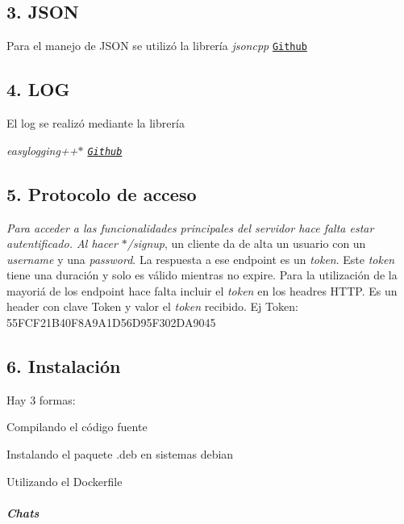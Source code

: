  \subsection*{3. J\+S\+ON}

Para el manejo de J\+S\+ON se utilizó la librería {\itshape jsoncpp} \href{https://github.com/open-source-parsers/jsoncpp}{\tt Github}



 \subsection*{4. L\+OG}

El log se realizó mediante la librería {\itshape easylogging++$\ast$ \href{https://github.com/easylogging/easyloggingpp}{\tt Github} 

 \subsection*{5. Protocolo de acceso}}

{\itshape  Para acceder a las funcionalidades principales del servidor hace falta estar autentificado. Al hacer $\ast$/signup}, un cliente da de alta un usuario con un {\itshape username} y una {\itshape password}. La respuesta a ese endpoint es un {\itshape token}. Este {\itshape token} tiene una duración y solo es válido mientras no expire. Para la utilización de la mayoriá de los endpoint hace falta incluir el {\itshape token} en los headres H\+T\+TP. Es un header con clave {\ttfamily Token} y valor el {\itshape token} recibido. Ej {\ttfamily Token\+: 55\+F\+C\+F21\+B40\+F8\+A9\+A1\+D56\+D95\+F302\+D\+A9045}

\subsection*{6. Instalación}

Hay 3 formas\+:
\begin{DoxyItemize}
\item Compilando el código fuente
\item Instalando el paquete {\ttfamily .deb} en sistemas debian
\item Utilizando el {\ttfamily Dockerfile}
\end{DoxyItemize}

\subparagraph*{Chats}

